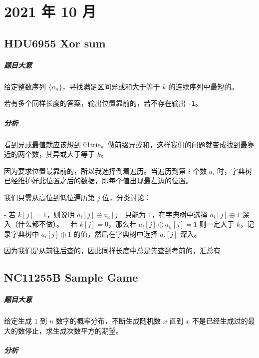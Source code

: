 \chapter{2021 年 10 月}

\section{HDU6955 Xor sum}

\paragraph{题目大意}

给定整数序列 $\{a_n\}$，寻找满足区间异或和大于等于 $k$ 的连续序列中最短的。

若有多个同样长度的答案，输出位置靠前的，若不存在输出 \verb`-1`。

\paragraph{分析}

看到异或最值就应该想到 01trie。做前缀异或和，这样我们的问题就变成找到最靠近的两个数，其异或大于等于 $k$。

因为要求位置最靠前的，所以我选择倒着遍历。当遍历到第 $i$ 个数 $a_i$ 时，字典树已经维护好此位置之后的数据，即每个值出现最左边的位置。

我们只需从高位到低位遍历第 $j$ 位，分类讨论：

- 若 $k[j] = 1$，则说明 $a_i[j] \oplus a_u[j]$ 只能为 $1$，在字典树中选择 $a_i[j] \oplus 1$ 深入（什么都不做）。
- 若 $k[j] = 0$，那么若 $a_i[j] \oplus a_u[j] = 1$ 则一定大于 $k$，记录字典树中 $a_i[j] \oplus 1$ 的值，然后在字典树中选择 $a_i[j]$ 深入。

因为我们是从前往后查的，因此同样长度中总是先查到考前的，汇总有

\section{NC11255B Sample Game}

\paragraph{题目大意}

给定生成 $1$ 到 $n$ 数字的概率分布，不断生成随机数 $x$ 直到 $x$ 不是已经生成过的最大的数停止，求生成次数平方的期望。

\paragraph{分析}


